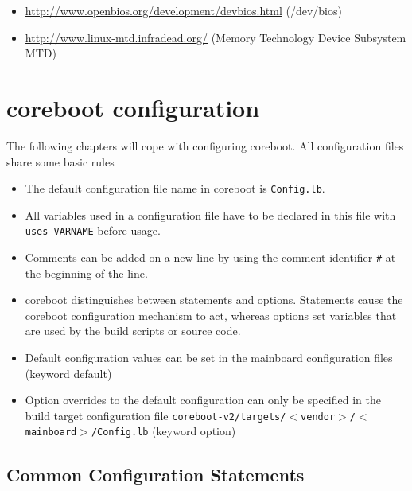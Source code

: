 \documentclass[titlepage,12pt]{article}
\begin{document}
\begin{itemize}
\item \url{http://www.openbios.org/development/devbios.html} (/dev/bios)
\item \url{http://www.linux-mtd.infradead.org/} (Memory Technology Device Subsystem MTD)
\end{itemize}

\newpage

%
%

\section{coreboot configuration}
The following chapters will cope with configuring coreboot. All
configuration files share some basic rules
\begin{itemize}
\item
The default configuration file name in coreboot is \texttt{Config.lb}.
\item
All variables used in a configuration file have to be declared in this
file with \texttt{uses VARNAME} before usage.
\item
Comments can be added on a new line by using the comment identifier
\texttt{\#} at the beginning of the line.
\item
coreboot distinguishes between statements and options. Statements cause
the coreboot configuration mechanism to act, whereas options set
variables that are used by the build scripts or source code.
\item
Default configuration values can be set in the mainboard configuration
files (keyword default)
\item
Option overrides to the default configuration can only be specified in
the build target configuration file
\texttt{coreboot-v2/targets/$<$vendor$>$/$<$mainboard$>$/Config.lb}
(keyword option)
\end{itemize}

\subsection{Common Configuration Statements}
\end{document}
